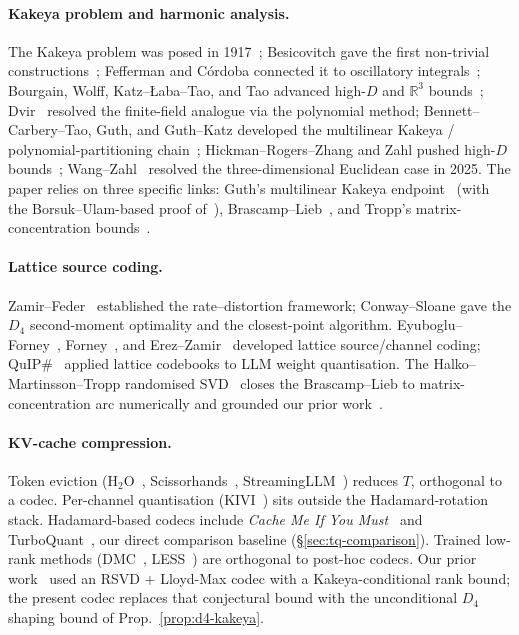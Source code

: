 \documentclass[10pt,a4paper]{article}
\theoremstyle{definition}
\theoremstyle{plain}
\newcommand{\R}{\mathbb{R}}
\begin{document}
\paragraph{Kakeya problem and harmonic analysis.}
The Kakeya problem was posed in 1917~\cite{kakeya-problem};
Besicovitch gave the first non-trivial
constructions~\cite{besicovitch-1919,besicovitch-1928}; Fefferman
and C\'ordoba connected it to oscillatory
integrals~\cite{fefferman-ball,cordoba-multiplier}; Bourgain,
Wolff, Katz--{\L}aba--Tao, and Tao advanced high-$D$ and
$\R^3$ bounds~\cite{bourgain-kakeya,wolff-kakeya,katz-laba-tao,katz-tao-discretized,tao-kakeya-survey};
Dvir~\cite{dvir-finite-field,dvir-kopparty-saraf-sudan} resolved
the finite-field analogue via the polynomial method;
Bennett--Carbery--Tao, Guth, and Guth--Katz developed the
multilinear Kakeya / polynomial-partitioning
chain~\cite{bennett-carbery-tao,guth-endpoint,guth-katz};
Hickman--Rogers--Zhang and Zahl pushed high-$D$
bounds~\cite{hickman-rogers-zhang,zahl-restricted,zahl-2022};
Wang--Zahl~\cite{wang-zahl} resolved the three-dimensional
Euclidean case in 2025. The paper relies on three specific links:
Guth's multilinear Kakeya endpoint~\cite{guth-endpoint}
(with the Borsuk--Ulam-based proof of~\cite{carbery-valdimarsson}),
Brascamp--Lieb~\cite{bennett-carbery-christ-tao},
and Tropp's matrix-concentration
bounds~\cite{tropp-matrix-chernoff}.

\paragraph{Lattice source coding.}
Zamir--Feder~\cite{zamir-feder} established the
rate--distortion framework; Conway--Sloane
\cite{conway-sloane-d4,conway-sloane-book} gave the $D_4$
second-moment optimality and the closest-point algorithm.
Eyuboglu--Forney~\cite{eyuboglu-forney},
Forney~\cite{forney-trellis}, and
Erez--Zamir~\cite{erez-zamir} developed lattice source/channel
coding; QuIP\#~\cite{quip-sharp} applied lattice codebooks to
LLM weight quantisation. The Halko--Martinsson--Tropp randomised
SVD~\cite{halko-martinsson-tropp} closes the Brascamp--Lieb to
matrix-concentration arc numerically and grounded our prior
work~\cite{kakeya-v13-paper}.

\paragraph{KV-cache compression.}
Token eviction (H$_2$O~\cite{h2o},
Scissorhands~\cite{scissorhands},
StreamingLLM~\cite{streaming-llm}) reduces $T$, orthogonal to a
codec. Per-channel quantisation (KIVI~\cite{kivi}) sits outside
the Hadamard-rotation stack. Hadamard-based codecs include
\emph{Cache Me If You Must}~\cite{shutova-cache} and
TurboQuant~\cite{turboquant-vllm,vllm-pr-38479,vllm-pr-40194,vllm-pr-39953,vllm-pr-40060,vllm-pr-40122},
our direct comparison baseline (\S\ref{sec:tq-comparison}).
Trained low-rank methods (DMC~\cite{dmc}, LESS~\cite{less}) are
orthogonal to post-hoc codecs. Our prior
work~\cite{kakeya-v13-paper} used an RSVD + Lloyd-Max codec with a
Kakeya-conditional rank bound; the present codec replaces that
conjectural bound with the unconditional $D_4$ shaping bound of
Prop.~\ref{prop:d4-kakeya}.
\end{document}
